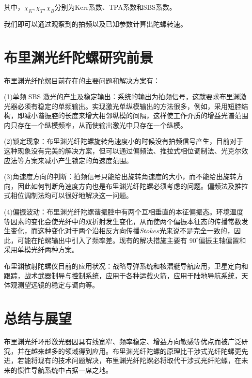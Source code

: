 \documentclass[UTF8]{ctexart}
\begin{document}
其中，$\chi_{K},\chi_{T},\chi_{B}$分别为Kerr系数、TPA系数和SBS系数。


我们即可以通过观察到的拍频以及已知参数计算出陀螺转速。
\section{布里渊光纤陀螺研究前景}
布里渊光纤陀螺目前存在的主要问题和解决方案有\cite{洪伟2010布里渊光纤环形激光器的发展与应用}：


(1)单频 SBS 激光的产生及稳定输出：系统的输出为拍频信号，这就要求布里渊激光器必须有稳定的单频输出。实现激光单纵模输出的方法很多，例如，采用短腔结构，即减小谐振腔的长度来增大相邻纵模的间隔，这样使工作介质的增益光谱范围内只存在一个纵模频率，从而使输出激光中只存在一个纵模。


(2)锁定现象：布里渊光纤陀螺旋转角速度小的时候没有拍频信号产生，目前对于这种现象没有完美的解决方案，但可以通过偏频法、推拉式相位调制法、光克尔效应法等方案来减小产生锁定的角速度范围。


(3)角速度方向的判断：拍频信号只能给出旋转角速度的大小，而不能给出旋转方向，因此如何判断角速度方向也是布里渊光纤陀螺必须考虑的问题。偏频法及推拉式相位调制法均可以很好地解决这一问题。


(4)偏振波动：布里渊光纤陀螺谐振腔中有两个互相垂直的本征偏振态。环境温度等因素的变化会使光纤中的双折射发生变化，从而使两个偏振本征态的传播常数发生变化，而这种变化对于两个沿相反方向传播$ Stokes $光来说不是完全一致的，因此，可能在陀螺输出中引入了频率差。现有的解决措施主要有 $90^{\circ}$偏振主轴偏置和采用单模光纤两种方案。


布里渊散射陀螺仪目前的应用状况：战略导弹系统和核潜艇导航应用，卫星定向和跟踪，战术武器制导与控制系统，应用于各种运载火箭，应用于陆地导航系统，天体观测望远镜的稳定与调向等。
\section{总结与展望}
布里渊光纤环形激光器因具有线宽窄、频率稳定、增益方向敏感等优点而被广泛研究，并在越来越多的领域得到应用。布里渊光纤陀螺的原理比干涉式光纤陀螺更先进，若能将现有的技术问题解决，布里渊光纤陀螺必将取代干涉式光纤陀螺，在未来的惯性导航系统中占据一席之地。
\printbibliography[heading = bibintoc]
\end{document}
